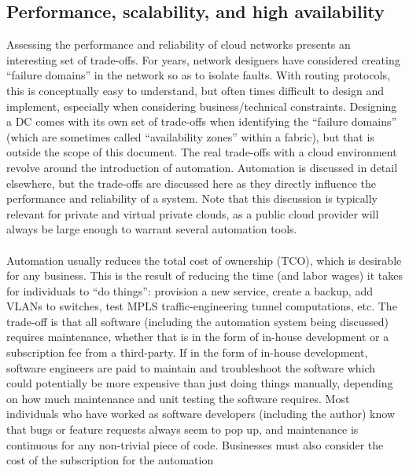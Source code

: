 \subsection{Performance, scalability, and high availability}
% 
Assessing the performance and reliability of cloud networks presents an
interesting set of trade-offs. For years, network designers have considered
creating ``failure domains'' in the network so as to isolate faults. With
routing protocols, this is conceptually easy to understand, but often times
difficult to design and implement, especially when considering
business/technical constraints. Designing a DC comes with its own set of
trade-offs when identifying the ``failure domains'' (which are sometimes called
``availability zones'' within a fabric), but that is outside the scope of this
document. The real trade-offs with a cloud environment revolve around the
introduction of automation. Automation is discussed in detail elsewhere,
but the trade-offs are discussed here as they directly influence the
performance and reliability of a system. Note that this discussion is
typically relevant for private and virtual private clouds, as a public cloud
provider will always be large enough to warrant several automation tools.
\\ \\
Automation usually reduces the total cost of ownership (TCO), which is
desirable for any business. This is the result of reducing the time (and labor
wages) it takes for individuals to ``do things'': provision a new service,
create a backup, add VLANs to switches, test MPLS traffic-engineering tunnel
computations, etc. The trade-off is that all software (including the
automation system being discussed) requires maintenance, whether that is in
the form of in-house development or a subscription fee from a third-party. If
in the form of in-house development, software engineers are paid to maintain
and troubleshoot the software which could potentially be more expensive than
just doing things manually, depending on how much maintenance and unit testing
the software requires. Most individuals who have worked as software developers
(including the author) know that bugs or feature requests always seem to pop
up, and maintenance is continuous for any non-trivial piece of code.
Businesses must also consider the cost of the subscription for the automation
